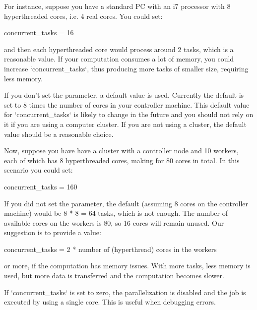 For instance, suppose you have a standard PC with an i7 processor with 8
hyperthreaded cores, i.e. 4 real cores. You could set:

concurrent\_tasks = 16

and then each hyperthreaded core would process around 2 tasks, which is a
reasonable value. If your computation consumes a lot of memory, you could
increase `concurrent\_tasks`, thus producing more tasks of smaller size,
requiring less memory.

If you don't set the parameter, a default value is used. Currently the default
is set to 8 times the number of cores in your controller machine. This default
value for `concurrent\_tasks` is likely to change in the future and you should
not rely on it if you are using a computer cluster. If you are not using a
cluster, the default value should be a reasonable choice.

Now, suppose you have have a cluster with a controller node and 10 workers,
each of which has 8 hyperthreaded cores, making for 80 cores in total. In this
scenario you could set:

concurrent\_tasks = 160

If you did not set the parameter, the default (assuming 8 cores on the
controller machine) would be 8 * 8 = 64 tasks, which is not enough. The number
of available cores on the workers is 80, so 16 cores will remain unused. Our
suggestion is to provide a value:

concurrent\_tasks = 2 * number of (hyperthread) cores in the workers

or more, if the computation has memory issues. With more tasks, less memory is
used, but more data is transferred and the computation becomes slower.

If `concurrent\_tasks` is set to zero, the parallelization is disabled and the
job is executed by using a single core. This is useful when debugging errors.
